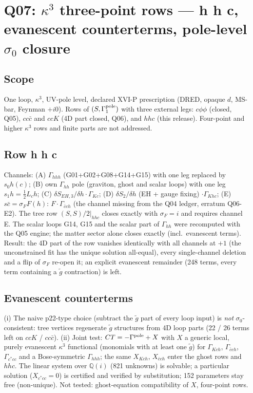 \section{Q07: $\kappa^3$ three-point rows --- h h c, evanescent counterterms, pole-level $\sigma_0$ closure}
\subsection*{Scope}
One loop, $\kappa^3$, UV-pole level, declared XVI-P prescription (DRED, opaque $d$, MS-bar, Feynman $+i0$). Rows of
$(S,\Gamma_1^{\rm pole})$ with three external legs: $c\phi\phi$ (closed, Q05), $cc\bar c$ and $ccK$ (4D part closed,
Q06), and $hhc$ (this release). Four-point and higher $\kappa^3$ rows and finite parts are not addressed.
\subsection*{Row h h c}
Channels: (A) $\Gamma_{hhh}$ (G01+G02+G08+G14+G15) with one leg replaced by $s_0h(c)$; (B) own $\Gamma_{hh}$ pole
(graviton, ghost and scalar loops) with one leg $s_1h=\tfrac12 L_c h$; (C) $\delta S_{EH,3}/\delta h\cdot\Gamma_{Kc}$;
(D) $\delta S_2/\delta h$ (EH + gauge fixing) $\cdot\Gamma_{Khc}$; (E) $s\bar c=\sigma_F F(h)$:
$F\cdot\Gamma_{\bar c c h}$ (the channel missing from the Q04 ledger, erratum Q06-E2). The tree row
$(S,S)/2|_{hhc}$ closes exactly with $\sigma_F=i$ and requires channel E. The scalar loops G14, G15 and the scalar
part of $\Gamma_{hh}$ were recomputed with the Q05 engine; the matter sector alone closes exactly (incl.\ evanescent
terms). Result: the 4D part of the row vanishes identically with all channels at $+1$ (the unconstrained fit has the
unique solution all-equal), every single-channel deletion and a flip of $\sigma_F$ re-open it; an explicit
evanescent remainder (248 terms, every term containing a $\tilde g$ contraction) is left.
\subsection*{Evanescent counterterms}
(i) The naive p22-type choice (subtract the $\tilde g$ part of every loop input) is \emph{not} $\sigma_0$-consistent:
tree vertices regenerate $\tilde g$ structures from 4D loop parts (22 / 26 terms left on $ccK$ / $cc\bar c$).
(ii) Joint test: $CT=-\Gamma^{\rm pole}+X$ with $X$ a generic local, purely evanescent $\kappa^3$ functional
(monomials with at least one $\tilde g$) for $\Gamma_{Kch}$, $\Gamma_{\bar c ch}$, $\Gamma_{c^*cc}$ and a Bose-symmetric
$\Gamma_{hhh}$; the same $X_{Kch}$, $X_{\bar c ch}$ enter the ghost rows and $hhc$. The linear system over
$\mathbb Q(i)$ (821 unknowns) is solvable; a particular solution ($X_{c^*cc}=0$) is certified and verified by
substitution; 152 parameters stay free (non-unique). Not tested: ghost-equation compatibility of $X$, four-point rows.
